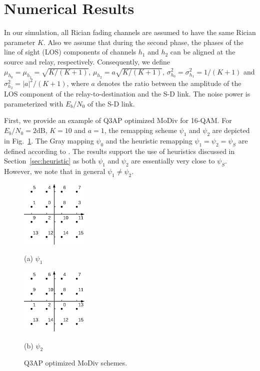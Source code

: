 \documentclass[journal,draftcls,onecolumn,12pt,twoside]{IEEEtran}
\begin{document}
\section{Numerical Results}
\label{sec:simulation}
In our simulation, all Rician fading channels are assumed to have the same
Rician parameter $K$. Also we assume that during the second phase, the phases of the
line of sight (LOS) components of channels $h_1$ and $h_2$ can be aligned at the
source and relay, respectively.
Consequently, we define $\mu_{h_0} = \mu_{h_1} = \sqrt{K/(K + 1)}$,
$\mu_{h_2}=a\sqrt{K/(K + 1)}$,  $\sigma_{h_0}^2 = \sigma_{h_1}^2 = 1/(K+1)$ and
$\sigma_{h_2}^2 = |a|^2/(K+1)$, where $a$ denotes the ratio
between the amplitude of the LOS component of the
relay-to-destination and the S-D link. The noise power is
parameterized with $E_b/N_0$ of the S-D link.

First, we provide an example of Q3AP optimized MoDiv for 16-QAM. For $E_b/N_0 =
2\mbox{dB}$, $K = 10$ and $a = 1$, the remapping scheme $\psi_1$ and $\psi_2$
are depicted in Fig.~\ref{fig:example}. The Gray mapping $\psi_0$ and the
heuristic remapping $\psi_1=\psi_2=\psi_S$ are defined according to
\cite{seddik2008trans}. The results support the use of heuristics discussed in
Section~\ref{sec:heuristic} as both $\psi_1$ and $\psi_2$ are essentially very
close to $\psi_S$. However, we note that in general $\psi_1\not=\psi_2$.

\begin{figure}[!t]
    \begin{minipage}[b]{0.48\linewidth}
      \centering
      \centerline{\includegraphics[width=3.2cm]{./figs/psi1.eps}}
      \centerline{(a) $\psi_1$}\medskip
    \end{minipage}
    \hfill
    \begin{minipage}[b]{.48\linewidth}
      \centering
      \centerline{\includegraphics[width=3.2cm]{./figs/psi2.eps}}
      \centerline{(b) $\psi_2$}\medskip
    \end{minipage}
    \caption{Q3AP optimized MoDiv schemes.}
    \label{fig:example}
\end{figure}
\end{document}
